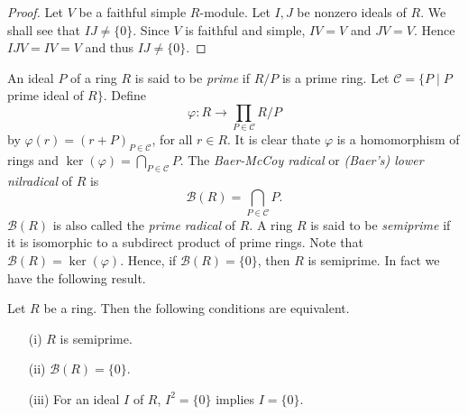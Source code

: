 \begin{proof}
Let $V$ be a faithful simple $R$-module. Let $I,J$ be nonzero ideals of
$R$. We shall see that $IJ\neq \{0\}$. Since $V$ is faithful and simple,
$IV=V$ and $JV=V$. Hence $IJV=IV=V$ and thus $IJ\neq \{0\}$. 
\end{proof}

An ideal $P$ of a ring $R$ is said to be {\em prime} if $R/P$ is a prime ring.
Let $\mathcal{C}=\{ P\mid P$ prime ideal of $R\}$. Define
$$\varphi\colon R\rightarrow \prod_{P\in\mathcal{C}}R/P$$
by $\varphi (r)=(r+P)_{P\in\mathcal{C}}$, for all $r\in R$. It is clear thate $\varphi$ 
is a homomorphism of rings and $\ker(\varphi
)=\bigcap_{P\in \mathcal{C}}P$. The {\em Baer-McCoy radical} or {\em (Baer's) lower nilradical} of $R$ is
$$\mathcal{B}(R)=\bigcap_{P\in\mathcal{C}}P.$$
$\mathcal{B}(R)$ is also called the {\em prime radical} of $R$.
A ring $R$ is said to be {\em semiprime} if it is isomorphic to a subdirect product of prime rings.
Note that $\mathcal{B}(R)=\ker(\varphi)$. Hence, if $\mathcal{B}(R)=\{0\}$, then $R$ is semiprime. 
In fact we have the following result.

\begin{theorem}\label{Teorema 1.3.6}
Let $R$ be a ring. Then the following conditions are equivalent.
\begin{itemize}\item[(i)] $R$ is semiprime.
\item[(ii)] $\mathcal{B}(R)=\{0\}$.
\item[(iii)] For an ideal $I$ of $R$, $I^2=\{0\}$ implies $I=\{0\}$.
\end{itemize}
\end{theorem}

